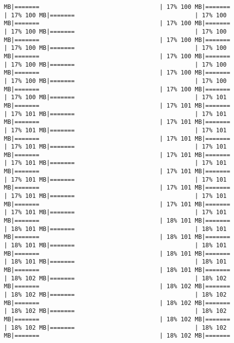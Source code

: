 \documentclass[
]{article}
\begin{document}
\begin{verbatim}
MB|=======                                  | 17% 100 MB|=======                                  | 17% 100 MB|=======                                  | 17% 100 MB|=======                                  | 17% 100 MB|=======                                  | 17% 100 MB|=======                                  | 17% 100 MB|=======                                  | 17% 100 MB|=======                                  | 17% 100 MB|=======                                  | 17% 100 MB|=======                                  | 17% 100 MB|=======                                  | 17% 100 MB|=======                                  | 17% 100 MB|=======                                  | 17% 100 MB|=======                                  | 17% 100 MB|=======                                  | 17% 100 MB|=======                                  | 17% 100 MB|=======                                  | 17% 100 MB|=======                                  | 17% 101 MB|=======                                  | 17% 101 MB|=======                                  | 17% 101 MB|=======                                  | 17% 101 MB|=======                                  | 17% 101 MB|=======                                  | 17% 101 MB|=======                                  | 17% 101 MB|=======                                  | 17% 101 MB|=======                                  | 17% 101 MB|=======                                  | 17% 101 MB|=======                                  | 17% 101 MB|=======                                  | 17% 101 MB|=======                                  | 17% 101 MB|=======                                  | 17% 101 MB|=======                                  | 17% 101 MB|=======                                  | 17% 101 MB|=======                                  | 17% 101 MB|=======                                  | 17% 101 MB|=======                                  | 17% 101 MB|=======                                  | 17% 101 MB|=======                                  | 17% 101 MB|=======                                  | 17% 101 MB|=======                                  | 18% 101 MB|=======                                  | 18% 101 MB|=======                                  | 18% 101 MB|=======                                  | 18% 101 MB|=======                                  | 18% 101 MB|=======                                  | 18% 101 MB|=======                                  | 18% 101 MB|=======                                  | 18% 101 MB|=======                                  | 18% 101 MB|=======                                  | 18% 101 MB|=======                                  | 18% 102 MB|=======                                  | 18% 102 MB|=======                                  | 18% 102 MB|=======                                  | 18% 102 MB|=======                                  | 18% 102 MB|=======                                  | 18% 102 MB|=======                                  | 18% 102 MB|=======                                  | 18% 102 MB|=======                                  | 18% 102 MB|=======                                  | 18% 102 MB|=======                                  | 18% 102 MB|=======                                  | 18% 102 MB|=======               
\end{verbatim}
\end{document}
